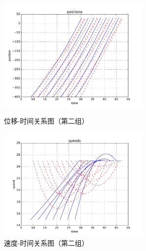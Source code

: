 \begin{figure}[htbp]
\begin{minipage}{0.48\textwidth}
  \centering
  \includegraphics[height=5.6cm]{figures/sim_case2/posi.pdf}
  \caption{位移-时间关系图（第二组）}
  \label{fig:case2:posi}
\end{minipage}\hfill
\begin{minipage}{0.48\textwidth}
  \centering
  \includegraphics[height=5.6cm]{figures/sim_case2/speed.pdf}
  \caption{速度-时间关系图（第二组）}
  \label{fig:case2:speed}
\end{minipage}
\end{figure}

